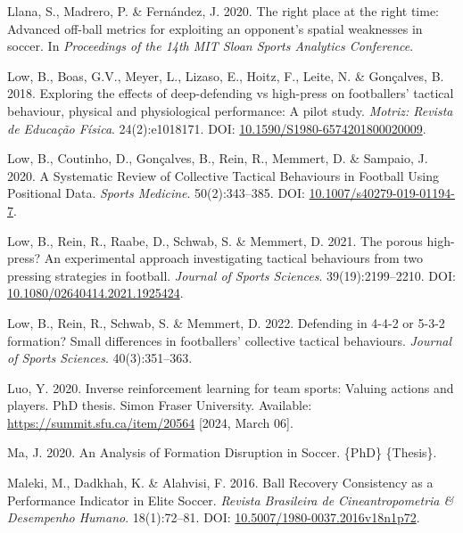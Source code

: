 \documentclass[
  a4paper,
  twoside]{uoe-thesis-template}
\newlength{\cslhangindent}
\newenvironment{CSLReferences}[2] %
 {\begin{list}{}{%
  \setlength{\itemindent}{0pt}
  \setlength{\leftmargin}{0pt}
  \setlength{\parsep}{0pt}
  \ifodd #1
   \setlength{\leftmargin}{\cslhangindent}
   \setlength{\itemindent}{-1\cslhangindent}
  \fi
  \setlength{\itemsep}{#2\baselineskip}}}
 {\end{list}}
\begin{document}
\begin{CSLReferences}{0}{0}
Llana, S., Madrero, P. \& Fernández, J. 2020. The right place at the
right time: {Advanced} off-ball metrics for exploiting an opponent's
spatial weaknesses in soccer. In \emph{Proceedings of the 14th {MIT}
{Sloan} {Sports} {Analytics} {Conference}}.

Low, B., Boas, G.V., Meyer, L., Lizaso, E., Hoitz, F., Leite, N. \&
Gonçalves, B. 2018. Exploring the effects of deep-defending vs
high-press on footballers' tactical behaviour, physical and
physiological performance: {A} pilot study. \emph{Motriz: Revista de
Educação Física}. 24(2):e1018171. DOI:
\href{https://doi.org/10.1590/S1980-6574201800020009}{10.1590/S1980-6574201800020009}.

Low, B., Coutinho, D., Gonçalves, B., Rein, R., Memmert, D. \& Sampaio,
J. 2020. A {Systematic} {Review} of {Collective} {Tactical} {Behaviours}
in {Football} {Using} {Positional} {Data}. \emph{Sports Medicine}.
50(2):343--385. DOI:
\href{https://doi.org/10.1007/s40279-019-01194-7}{10.1007/s40279-019-01194-7}.

Low, B., Rein, R., Raabe, D., Schwab, S. \& Memmert, D. 2021. The porous
high-press? {An} experimental approach investigating tactical behaviours
from two pressing strategies in football. \emph{Journal of Sports
Sciences}. 39(19):2199--2210. DOI:
\href{https://doi.org/10.1080/02640414.2021.1925424}{10.1080/02640414.2021.1925424}.

Low, B., Rein, R., Schwab, S. \& Memmert, D. 2022. Defending in 4-4-2 or
5-3-2 formation? {Small} differences in footballers' collective tactical
behaviours. \emph{Journal of Sports Sciences}. 40(3):351--363.

Luo, Y. 2020. Inverse reinforcement learning for team sports: {Valuing}
actions and players. PhD thesis. Simon Fraser University. Available:
\url{https://summit.sfu.ca/item/20564} {[}2024, March 06{]}.

Ma, J. 2020. An {Analysis} of {Formation} {Disruption} in {Soccer}.
\{PhD\} \{Thesis\}.

Maleki, M., Dadkhah, K. \& Alahvisi, F. 2016. Ball {Recovery}
{Consistency} as a {Performance} {Indicator} in {Elite} {Soccer}.
\emph{Revista Brasileira de Cineantropometria \& Desempenho Humano}.
18(1):72--81. DOI:
\href{https://doi.org/10.5007/1980-0037.2016v18n1p72}{10.5007/1980-0037.2016v18n1p72}.


\end{CSLReferences}
\end{document}
